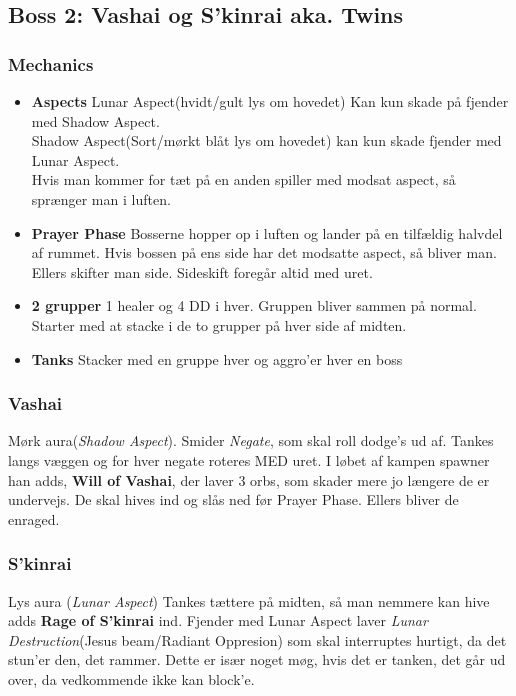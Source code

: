 \subsection*{Boss 2: Vashai og S'kinrai aka. Twins}
\subsubsection*{Mechanics}
\begin{itemize}
  \item \textbf{Aspects} Lunar Aspect(hvidt/gult lys om hovedet) Kan kun skade
    på fjender med Shadow Aspect.\\
    Shadow Aspect(Sort/mørkt blåt lys om hovedet) kan kun skade fjender med
    Lunar Aspect.\\
    Hvis man kommer for tæt på en anden spiller med modsat aspect, så sprænger
    man i luften.
  \item \textbf{Prayer Phase} Bosserne hopper op i luften og lander på en
    tilfældig halvdel af rummet. Hvis bossen på ens side har det modsatte
    aspect, så bliver man. Ellers skifter man side. Sideskift foregår altid med
    uret.
  \item \textbf{2 grupper} 1 healer og 4 DD i hver. Gruppen bliver sammen på
    normal. Starter med at stacke i de to grupper på hver side af midten. 
  \item \textbf{Tanks} Stacker med en gruppe hver og aggro'er hver en boss

\end{itemize}
\subsubsection*{Vashai}
Mørk aura(\emph{Shadow Aspect}). Smider \emph{Negate}, som skal roll dodge's ud
af. Tankes langs væggen og for hver negate roteres MED uret. I løbet af kampen
spawner han adds, \textbf{Will of Vashai}, der laver 3 orbs, som skader mere jo
længere de er undervejs. De skal hives ind og slås ned før
Prayer Phase. Ellers bliver de enraged.
\subsubsection*{S'kinrai}
Lys aura (\emph{Lunar Aspect}) Tankes tættere på midten, så man nemmere kan
hive adds \textbf{Rage of S'kinrai} ind. Fjender med Lunar Aspect laver
\emph{Lunar Destruction}(Jesus beam/Radiant Oppresion) som skal interruptes
hurtigt, da det stun'er den, det rammer. Dette er især noget møg, hvis det er
tanken, det går ud over, da vedkommende ikke kan block'e.

